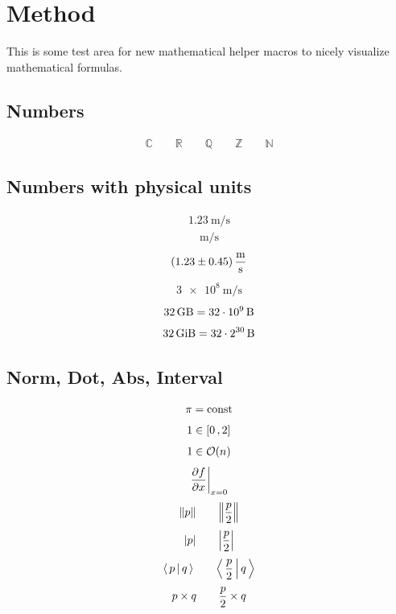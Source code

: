 
\chapter{Method}
\label{chap:method}

This is some test area for new mathematical helper macros to nicely visualize mathematical formulas.

\section{Numbers}
\begin{align}
    \mathbb{C}
    \qquad
    \mathbb{R}
    \qquad
    \mathbb{Q}
    \qquad
    \mathbb{Z}
    \qquad
    \mathbb{N}
\end{align}

\section{Numbers with physical units}
\begin{align}
    \SI{1.23}{\meter\per\second}
\end{align}
\begin{align}
    \si{\meter\per\second}
\end{align}
\begin{align}
    \SI{1.23\pm0.45}{\meter\per\second}
\end{align}
\begin{align}
    \SI{3e8}{\meter\per\second}
\end{align}
\begin{align}
    \SI{32}{\giga\byte} = \SI{32e9}{\byte}
\end{align}
\begin{align}
    \SI{32}{\gibi\byte} = \SI[exponent-base=2]{32e30}{\byte}
\end{align}

\section{Norm, Dot, Abs, Interval}
\begin{align}
    \pi = \mathrm{const}
\end{align}
\begin{align}
    1 \in [ 0 \,, 2 ]
\end{align}
\begin{align}
    1 \in \order{n}
\end{align}
\begin{align}
    \evalat{ \frac{\partial f}{\partial x} }{ x = 0 }
\end{align}
\begin{align}
    \norm{p} \qquad \norm{\frac{p}{2}}
\end{align}
\begin{align}
    \abs{p} \qquad \abs{\frac{p}{2}}
\end{align}
\begin{align}
    \dotproduct{p}{q} \qquad \dotproduct{\frac{p}{2}}{q}
\end{align}
\begin{align}
    p\times q \qquad \frac{p}{2}\times q
\end{align}

